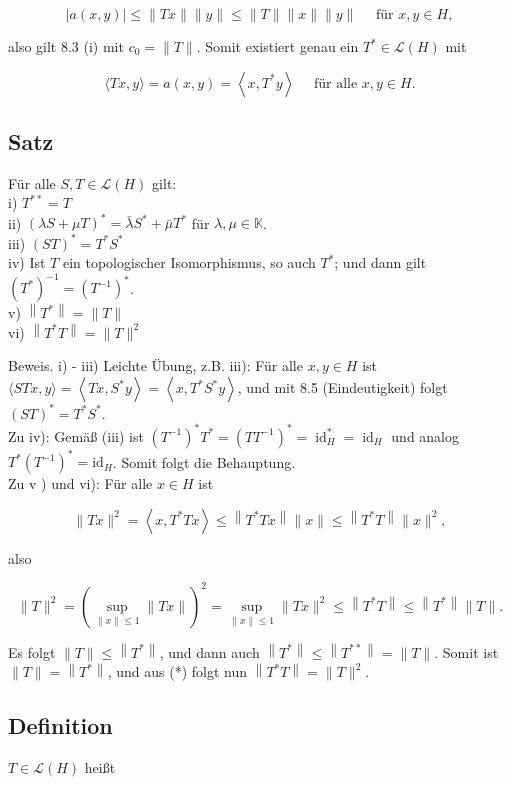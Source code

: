 \documentclass[10pt, letterpaper]{article}
\begin{document}
$$
|a(x, y)| \leq\|T x\|\|y\| \leq\|T\|\|x\|\|y\| \quad \text { für } x, y \in H,
$$

also gilt 8.3 (i) mit $c_{0}=\|T\|$. Somit existiert genau ein $T^{*} \in \mathcal{L}(H)$ mit

$$
\langle T x, y\rangle=a(x, y)=\left\langle x, T^{*} y\right\rangle \quad \text { für alle } x, y \in H .
$$

\subsection*{Satz}
Für alle $S, T \in \mathcal{L}(H)$ gilt:\\
i) $T^{* *}=T$\\
ii) $(\lambda S+\mu T)^{*}=\bar{\lambda} S^{*}+\bar{\mu} T^{*}$ für $\lambda, \mu \in \mathbb{K}$.\\
iii) $(S T)^{*}=T^{*} S^{*}$\\
iv) Ist $T$ ein topologischer Isomorphismus, so auch $T^{*}$; und dann gilt $\left(T^{*}\right)^{-1}= \left(T^{-1}\right)^{*}$.\\
v) $\left\|T^{*}\right\|=\|T\|$\\
vi) $\left\|T^{*} T\right\|=\|T\|^{2}$

Beweis. i) - iii) Leichte Übung, z.B. iii): Für alle $x, y \in H$ ist $\langle S T x, y\rangle=\left\langle T x, S^{*} y\right\rangle= \left\langle x, T^{*} S^{*} y\right\rangle$, und mit 8.5 (Eindeutigkeit) folgt $(S T)^{*}=T^{*} S^{*}$.\\
Zu iv): Gemäß (iii) ist $\left(T^{-1}\right)^{*} T^{*}=\left(T T^{-1}\right)^{*}=\operatorname{id}_{H}^{*}=\operatorname{id}_{H}$ und analog $T^{*}\left(T^{-1}\right)^{*}= \mathrm{id}_{H}$. Somit folgt die Behauptung.\\
Zu v ) und vi): Für alle $x \in H$ ist

$$
\|T x\|^{2}=\left\langle x, T^{*} T x\right\rangle \leq\left\|T^{*} T x\right\|\|x\| \leq\left\|T^{*} T\right\|\|x\|^{2},
$$

also

$$
\|T\|^{2}=\left(\sup _{\|x\| \leq 1}\|T x\|\right)^{2}=\sup _{\|x\| \leq 1}\|T x\|^{2} \leq\left\|T^{*} T\right\| \leq\left\|T^{*}\right\|\|T\| .
$$

Es folgt $\|T\| \leq\left\|T^{*}\right\|$, und dann auch $\left\|T^{*}\right\| \leq\left\|T^{* *}\right\|=\|T\|$. Somit ist $\|T\|=\left\|T^{*}\right\|$, und aus (*) folgt nun $\left\|T^{*} T\right\|=\|T\|^{2}$.

\subsection*{Definition}
$T \in \mathcal{L}(H)$ heißt
\end{document}
